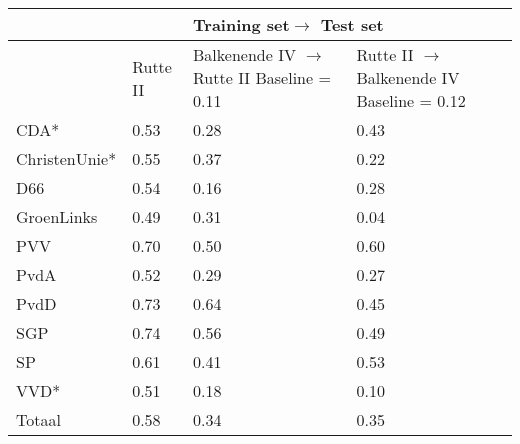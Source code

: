 \begin{tabular}{ll|ll}
\toprule
{}& {}&\multicolumn{2}{l}{Training set$\rightarrow$ Test set}\\
\midrule
{} &Rutte II &\makecell{Balkenende IV $\rightarrow$ Rutte II\\Baseline = 0.11}&  \makecell{Rutte II $\rightarrow$ Balkenende IV\\Baseline = 0.12}  \\
\midrule
CDA*          &0.53&       0.28 &    0.43  \\
ChristenUnie* &0.55&       0.37 &    0.22  \\
D66          &0.54&       0.16 &    0.28  \\
GroenLinks   &0.49&       0.31 &    0.04  \\
PVV          &0.70&       0.50 &    0.60  \\
PvdA         &0.52&       0.29 &    0.27  \\
PvdD         &0.73&       0.64 &    0.45 \\
SGP          &0.74&       0.56 &    0.49  \\
SP           &0.61&       0.41 &    0.53 \\
VVD*          &0.51&       0.18 &    0.10  \\ \hline
Totaal       &0.58&       0.34 &    0.35 \\
\bottomrule
\end{tabular}
